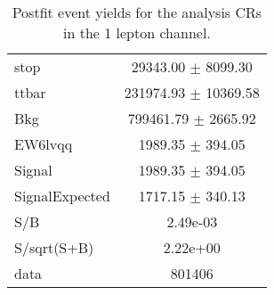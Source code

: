 \begin{table}
\begin{tabular}{|l|c|}
stop & 29343.00 $\pm$ 8099.30\\
ttbar & 231974.93 $\pm$ 10369.58\\
\hline
Bkg & 799461.79 $\pm$ 2665.92\\
\hline
EW6lvqq & 1989.35 $\pm$ 394.05\\
\hline
Signal & 1989.35 $\pm$ 394.05\\
SignalExpected & 1717.15 $\pm$ 340.13\\
\hline
S/B & 2.49e-03\\
S/sqrt(S+B) & 2.22e+00\\
\hline
data & 801406\\ \hline
\end{tabular}
\caption{Postfit event yields for the analysis CRs in the 1 lepton channel.}
\label{tab:1lepPostfitYield_CR}
\end{table}


